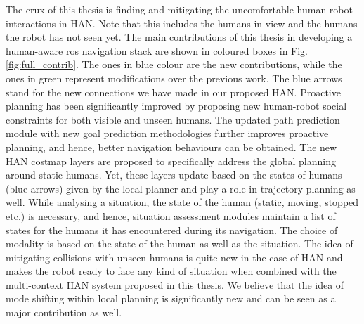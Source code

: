 The crux of this thesis is finding and mitigating the uncomfortable human-robot interactions in HAN. Note that this includes the humans in view and the humans the robot has not seen yet. The main contributions of this thesis in developing a human-aware \acrshort{ros} navigation stack are shown in coloured boxes in Fig. \ref{fig:full_contrib}. The ones in blue colour are the new contributions, while the ones in green represent modifications over the previous work. The blue arrows stand for the new connections we have made in our proposed HAN. Proactive planning has been significantly improved by proposing new human-robot social constraints for both visible and unseen humans. The updated path prediction module with new goal prediction methodologies further improves proactive planning, and hence, better navigation behaviours can be obtained. The new HAN costmap layers are proposed to specifically address the global planning around static humans. Yet, these layers update based on the states of humans (blue arrows) given by the local planner and play a role in trajectory planning as well. While analysing a situation, the state of the human (static, moving, stopped etc.) is necessary, and hence, situation assessment modules maintain a list of states for the humans it has encountered during its navigation. The choice of modality is based on the state of the human as well as the situation. The idea of mitigating collisions with unseen humans is quite new in the case of HAN and makes the robot ready to face any kind of situation when combined with the multi-context HAN system proposed in this thesis. We believe that the idea of mode shifting within local planning is significantly new and can be seen as a major contribution as well.



